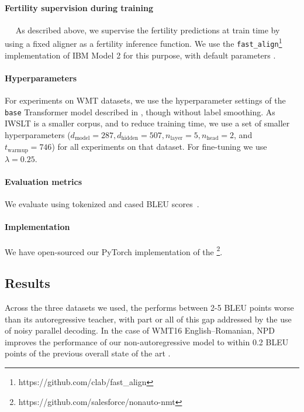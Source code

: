 \vspace{-5pt}
\paragraph{Fertility supervision during training}~~
As described above, we supervise the fertility predictions at train time by using a fixed aligner as a fertility inference function. We use the \texttt{fast\_align}\footnote{https://github.com/clab/fast\_align} implementation of IBM Model 2 for this purpose, with default parameters
\citep{dyer2013simple}.

\vspace{-5pt}
\paragraph{Hyperparameters}
For experiments on WMT datasets, we use the hyperparameter settings of the \texttt{base} Transformer model described in \citet{vaswani2017attention}, though without label smoothing. As IWSLT is a smaller corpus, and to reduce training time, we use a set of smaller hyperparameters ($d_{\text{model}}=287, d_{\text{hidden}}=507, n_{\text{layer}}=5, n_{\text{head}}=2$, and $t_\text{warmup}=746$) for all experiments on that dataset.
For fine-tuning we use $\lambda=0.25$.

\vspace{-5pt}
\paragraph{Evaluation metrics} We evaluate using tokenized and cased BLEU scores~\citep{papineni2002bleu}.

\vspace{-5pt}
\paragraph{Implementation} We have open-sourced our PyTorch implementation of the \model{}\footnote{https://github.com/salesforce/nonauto-nmt}.

\subsection{Results}
Across the three datasets we used, the \model{} performs between 2-5 BLEU points worse than its autoregressive teacher, with part or all of this gap addressed by the use of noisy parallel decoding. In the case of WMT16 English--Romanian, NPD improves the performance of our non-autoregressive model to within 0.2 BLEU points of the previous overall state of the art \citep{gehring2017convolutional}.

